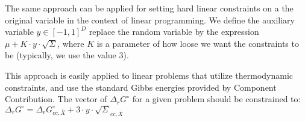\documentclass[11pt]{article}
\begin{document}
The same approach can be applied for setting hard linear constraints on a the original variable in the context of linear programming. We define the auxiliary variable $y \in [-1, 1]^D$ replace the random variable by the expression $\mu + K \cdot y \cdot \sqrt{\Sigma}$, where $K$ is a parameter of how loose we want the constraints to be (typically, we use the value $3$).

This approach is easily applied to linear problems that utilize thermodynamic constraints, and use the standard Gibbs energies provided by Component Contribution. The vector of $\Delta_{r}G^{\circ}$ for a given problem should be constrained to:
$\Delta_{r}G^{\circ} = \Delta_{r}G_{cc,\bar{X}}^{\circ} + 3 \cdot y \cdot \sqrt{\Sigma}_{cc,\bar{X}}$
\end{document}
